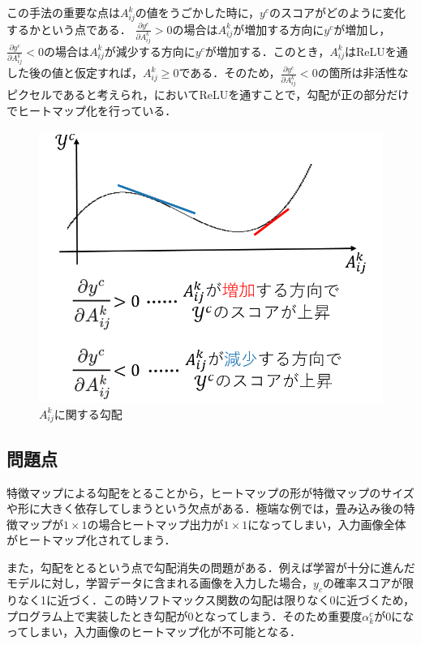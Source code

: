 この手法の重要な点は$A^k_{ij}$の値をうごかした時に，$y^c$のスコアがどのように変化するかという点である．
$\frac {\partial y^c}{\partial A^k_{ij}} > 0$の場合は$A^k_{ij}$が増加する方向に$y^c$が増加し，$\frac {\partial y^c}{\partial A^k_{ij}} < 0$の場合は$A^k_{ij}$が減少する方向に$y^c$が増加する．このとき，$A^k_{ij}$はReLUを通した後の値と仮定すれば，$A^k_{ij} \geq 0$である．そのため，$\frac {\partial y^c}{\partial A^k_{ij}} < 0$の箇所は非活性なピクセルであると考えられ，においてReLUを通すことで，勾配が正の部分だけでヒートマップ化を行っている．
\begin{figure}[htbp]
	\begin{center}
		\includegraphics[scale=0.63]{./images/old-study/gradient.png}
		\caption{$A^k_{ij}$に関する勾配}
		\label{fig:featuremap-gradient}
	\end{center}
\end{figure}


\clearpage
\subsection{問題点}\label{gradcam-problem}
特徴マップによる勾配をとることから，ヒートマップの形が特徴マップのサイズや形に大きく依存してしまうという欠点がある．極端な例では，畳み込み後の特徴マップが$1\times 1$の場合ヒートマップ出力が$1\times 1$になってしまい，入力画像全体がヒートマップ化されてしまう．

また，勾配をとるという点で勾配消失の問題がある．例えば学習が十分に進んだモデルに対し，学習データに含まれる画像を入力した場合，$y_c$の確率スコアが限りなく1に近づく．この時ソフトマックス関数の勾配は限りなく0に近づくため，プログラム上で実装したとき勾配が0となってしまう．そのため重要度$\alpha^c_k$が0になってしまい，入力画像のヒートマップ化が不可能となる．


